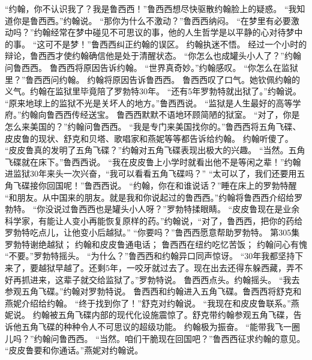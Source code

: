 \documentclass[a4paper,12pt,UTF8,twoside]{ctexbook}
\begin{document}
        “约翰，你不认识我了？我是鲁西西！”鲁西西想尽快驱散约翰脸上的疑惑。  
        “我知道你是鲁西西。”约翰说。  
        “那你为什么不激动？”鲁西西纳闷。  
        “在梦里有必要激动吗？”约翰经常在梦中碰见不可思议的事，他的人生哲学是以平静的心对待梦中的事。  
        “这可不是梦！”鲁西西纠正约翰的误区。  
        约翰执迷不悟。  
        经过一个小时的辩论，鲁西西才使约翰确信他是处于清醒状态。  
        “你怎么也成罐头小人了？”约翰问鲁西西。        
        鲁西西将原因告诉约翰。  
        “世界真奇妙。”约翰感叹。  
        “你怎么在监狱里？”鲁西西问约翰。  
        约翰将原因告诉鲁西西。  
        鲁西西叹了口气。她钦佩约翰的义气。约翰在监狱里毕竟陪了罗勃特30年。  
        “还有5年罗勃特就出狱了。”约翰说。  
        “原来地球上的监狱不光是关坏人的地方。”鲁西西说。  
        “监狱是人生最好的高等学府。”约翰向鲁西西传经送宝。  
        鲁西西默默不语地环顾简陋的狱室。  
        “对了，你是怎么来美国的？”约翰问鲁西西。  
        “我是专门来美国找你的。”鲁西西将五角飞碟、皮皮鲁的现状、舒克和贝塔、歌唱家和燕妮等等都告诉给约翰。  
        约翰听傻了。  
        “皮皮鲁真的发明了五角飞碟？”约翰对五角飞碟表现出极大的兴趣。  
        “当然。五角飞碟就在床下。”鲁西西说。  
        “我在皮皮鲁上小学时就看出他不是等闲之辈！”约翰进监狱30年来头一次兴奋，“我可以看看五角飞碟吗？”  
        “太可以了，我们还要用五角飞碟接你回国呢！”鲁西西说。  
        “约翰，你在和谁说话？”睡在床上的罗勃特醒  
        “和朋友。从中国来的朋友。就是我和你说起过的鲁西西。”约翰将鲁西西介绍给罗勃特。  
        “你没说过鲁西西也是罐头小人呀？”罗勃特揉眼睛。  
        “皮皮鲁现在是业余科学家，有能让人变小再能恢复原样的药。”约翰说，“对了，鲁西西，把你的药给罗勃特吃点儿，让他变小后越狱。”  
        “你要吗？”鲁西西愿意帮助罗勃特。          第305集  
        罗勃特谢绝越狱；  
        约翰和皮皮鲁通电话；  
        鲁西西在纽约吃忆苦饭；  
        约翰问心有愧    
        “不要。”罗勃特摇头。  
        “为什么？”鲁西西和约翰异口同声惊讶。  
        “30年我都坚持下来了，要越狱早越了。还剩5年，一咬牙就过去了。现在出去还得东躲西藏，弄不好再抓进来，这辈子就交给监狱了。”罗勃特说。  
        鲁西西点头。约翰摇头。  
        “我去参观五角飞碟。”约翰对罗勃特说。  
        鲁西西和约翰进入五角飞碟。鲁西西将舒克和燕妮介绍给约翰。  
        “终于找到你了！”舒克对约翰说。  
        “我现在和皮皮鲁联系。”燕妮说。        
        约翰被五角飞碟内部的现代化设施震惊了。舒克带约翰参观五角飞碟，告诉他五角飞碟的种种令人不可思议的超级功能。  
        约翰极为振奋。  
        “能带我飞一圈儿吗？”约翰问鲁西西。  
        “当然。咱们干脆现在回国吧？”鲁西西征求约翰的意见。  
        “皮皮鲁要和你通话。”燕妮对约翰说。  
\end{document}
